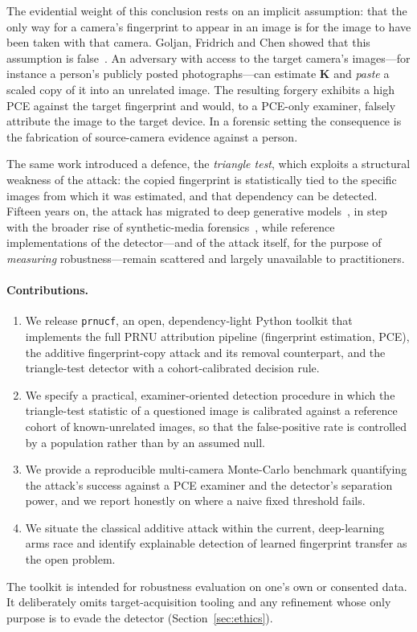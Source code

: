\documentclass[11pt]{article}
\newcommand{\K}{\mathbf{K}}
\newcommand{\code}[1]{\texttt{#1}}
\begin{document}
The evidential weight of this conclusion rests on an implicit assumption: that
the only way for a camera's fingerprint to appear in an image is for the image
to have been taken with that camera. Goljan, Fridrich and Chen showed that this
assumption is false~\cite{goljan2011}. An adversary with access to the target
camera's images---for instance a person's publicly posted photographs---can
estimate $\K$ and \emph{paste} a scaled copy of it into an unrelated image. The
resulting forgery exhibits a high PCE against the target fingerprint and would,
to a PCE-only examiner, falsely attribute the image to the target device. In a
forensic setting the consequence is the fabrication of source-camera evidence
against a person.

The same work introduced a defence, the \emph{triangle test}, which exploits a
structural weakness of the attack: the copied fingerprint is statistically tied
to the specific images from which it was estimated, and that dependency can be
detected. Fifteen years on, the attack has migrated to deep generative
models~\cite{cozzolino2021spoc}, in step with the broader rise of
synthetic-media forensics~\cite{verdoliva2020}, while reference
implementations of the detector---and of the attack itself, for the purpose of
\emph{measuring} robustness---remain scattered and largely unavailable to
practitioners.

\paragraph{Contributions.}
\begin{enumerate}
  \item We release \code{prnucf}, an open, dependency-light Python toolkit that
  implements the full PRNU attribution pipeline (fingerprint estimation, PCE),
  the additive fingerprint-copy attack and its removal counterpart, and the
  triangle-test detector with a cohort-calibrated decision rule.
  \item We specify a practical, examiner-oriented detection procedure in which
  the triangle-test statistic of a questioned image is calibrated against a
  reference cohort of known-unrelated images, so that the false-positive rate is
  controlled by a population rather than by an assumed null.
  \item We provide a reproducible multi-camera Monte-Carlo benchmark quantifying
  the attack's success against a PCE examiner and the detector's separation
  power, and we report honestly on where a naive fixed threshold fails.
  \item We situate the classical additive attack within the current,
  deep-learning arms race and identify explainable detection of learned
  fingerprint transfer as the open problem.
\end{enumerate}
The toolkit is intended for robustness evaluation on one's own or consented
data. It deliberately omits target-acquisition tooling and any refinement whose
only purpose is to evade the detector (Section~\ref{sec:ethics}).
\end{document}
